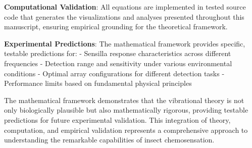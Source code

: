 \documentclass[
  13pt,
  a4paperpaper,
  12pt]{article}
\begin{document}
\textbf{Computational Validation}: All equations are implemented in
tested source code that generates the visualizations and analyses
presented throughout this manuscript, ensuring empirical grounding for
the theoretical framework.

\textbf{Experimental Predictions}: The mathematical framework provides
specific, testable predictions for: - Sensilla response characteristics
across different frequencies - Detection range and sensitivity under
various environmental conditions - Optimal array configurations for
different detection tasks - Performance limits based on fundamental
physical principles

The mathematical framework demonstrates that the vibrational theory is
not only biologically plausible but also mathematically rigorous,
providing testable predictions for future experimental validation. This
integration of theory, computation, and empirical validation represents
a comprehensive approach to understanding the remarkable capabilities of
insect chemosensation.
\end{document}
